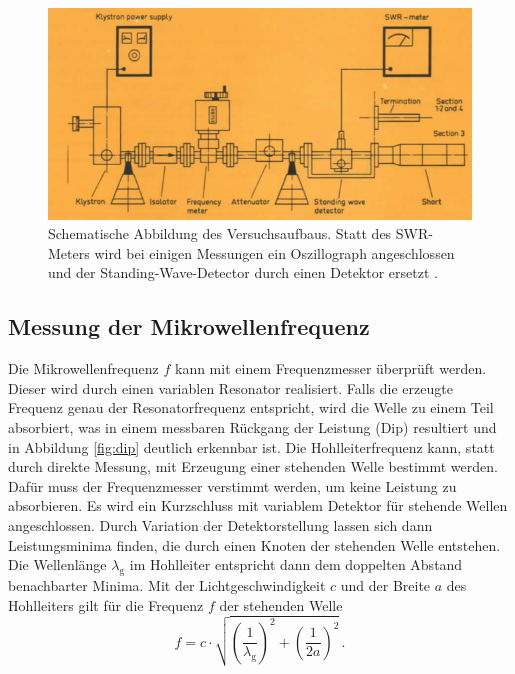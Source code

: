 \begin{figure}[p]
    \centering
    \includegraphics[width=0.8\linewidth]{img/aufbau_microwave.png}
    \caption{
        Schematische Abbildung des Versuchsaufbaus. Statt des
        SWR-Meters wird bei einigen Messungen ein Oszillograph angeschlossen
        und der Standing-Wave-Detector durch einen Detektor ersetzt \cite{V53}.
    }
    \label{fig:aufbau_microwave}
\end{figure}

\subsection{Messung der Mikrowellenfrequenz}
\label{subsec:messung}
Die Mikrowellenfrequenz $f$ kann mit einem Frequenzmesser überprüft werden.
Dieser wird durch einen variablen Resonator realisiert. Falls die
erzeugte Frequenz genau der Resonatorfrequenz entspricht, wird die Welle zu
einem Teil absorbiert, was in einem messbaren Rückgang der Leistung (Dip)
resultiert und in Abbildung \ref{fig:dip} deutlich erkennbar ist.
Die Hohlleiterfrequenz kann, statt durch
direkte Messung, mit Erzeugung einer stehenden Welle bestimmt werden.
Dafür muss der Frequenzmesser verstimmt werden, um keine Leistung zu
absorbieren.
Es wird ein Kurzschluss mit variablem Detektor für stehende Wellen
angeschlossen.
Durch Variation der Detektorstellung lassen sich dann Leistungsminima finden,
die durch einen Knoten der stehenden Welle entstehen.
Die Wellenlänge $\lambda_\text{g}$ im Hohlleiter entspricht dann dem doppelten
Abstand benachbarter Minima. Mit der Lichtgeschwindigkeit $c$
und der Breite $a$ des Hohlleiters gilt für die Frequenz $f$ der stehenden
Welle
\begin{equation}
    \label{frequenz}
    f = c\cdot\sqrt{\left(\frac{1}{\lambda_\text{g}}\right)^2 + \left(\frac{1}{2a}\right)^2} \,.
\end{equation}

